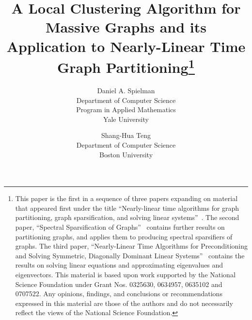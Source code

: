 \documentclass[11pt]{article}
\begin{document}
\title{A Local Clustering Algorithm for Massive Graphs and its Application to Nearly-Linear Time Graph
   Partitioning\thanks{This paper is the first in a sequence of three papers expanding
  on material that appeared first under the title
  ``Nearly-linear time algorithms for graph partitioning, 
    graph sparsification, and solving linear systems''~\cite{SpielmanTengPrecon}.
The second paper, ``Spectral Sparsification of Graphs''~\cite{SpielmanTengSparsifier}
  contains further results on partitioning graphs, and applies them to producing
  spectral sparsifiers of graphs.
The third paper, ``Nearly-Linear Time Algorithms for Preconditioning and Solving Symmetric, Diagonally Dominant Linear Systems''~\cite{SpielmanTengLinsolve} contains the results
  on solving linear equations and approximating eigenvalues and eigenvectors.
\vskip 0.01in
This material is based upon work supported by the National Science Foundation 
  under Grant Nos. 0325630, 0634957, 0635102 and 0707522.
Any opinions, findings, and conclusions or recommendations expressed in this material are those of the authors and do not necessarily reflect the views of the National Science Foundation.
}
}
\author{
Daniel A. Spielman\\
Department of Computer Science\\
Program in Applied Mathematics\\
Yale University
\and
Shang-Hua Teng\\
Department of Computer Science\\
Boston University}

\maketitle
\end{document}
